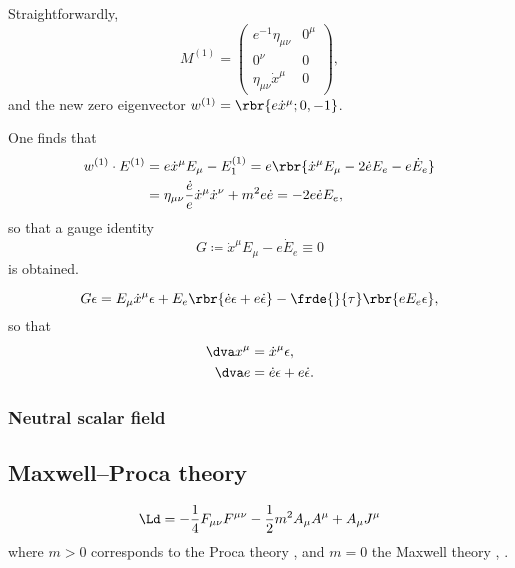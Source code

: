 \documentclass[a4paper,11pt]{article}
\begin{document}
Straightforwardly,
\begin{equation}
M^{(1)} =
\begin{pmatrix}
e^{-1}\eta_{\mu\nu} & 0^\mu \\
0^\nu & 0 \\
\eta_{\mu\nu}\dot{x}^\mu & 0
\end{pmatrix},
\end{equation}
and the new zero eigenvector $w^{(1)} = \rbr{e\dot{x}^\mu; 0, -1}$.

One finds that
\begin{align}
w^{(1)} \cdot E^{(1)} &= e\dot{x}^\mu E_\mu - E^{(1)}_1 =
e\rbr{\dot{x}^\mu E_\mu - 2 \dot{e} E_e - e\dot{E}_e} \\
&= \eta_{\mu\nu} \frac{\dot{e}}{e} \dot{x}^\mu \dot{x}^\nu  + m^2 e \dot{e}
= -2e \dot{e} E_e,
\end{align}
so that a gauge identity
\begin{equation}
G \coloneqq \dot{x}^\mu E_\mu - e \dot{E}_e \equiv 0
\end{equation}
is obtained.

\begin{equation}
G\epsilon = E_\mu \dot{x}^\mu \epsilon + E_e \rbr{\dot{e} \epsilon + e 
\dot{\epsilon}} - \frde{}{\tau}\rbr{e E_e \epsilon},
\end{equation}
so that
\begin{align}
\dva x^\mu &= \dot{x}^\mu \epsilon, \\
\dva e &= \dot{e} \epsilon + e \dot{\epsilon}.
\end{align}






\subsubsection{Neutral scalar field}
\cite[sec.\ 3.3]{Kiefer2012}

\subsection{Maxwell--Proca theory}

\begin{equation}
\Ld = -\frac{1}{4} F_{\mu\nu} F^{\mu\nu} - \frac{1}{2}m^2 A_\mu A^\mu + A_\mu 
J^\mu
\end{equation}
where $m > 0$ corresponds to the Proca theory \cite[sec.\ 2.3]{Gitman1990}, and 
$m = 0$ the Maxwell theory \cite[sec.\ 3.3.3]{Rothe2010}, \cite[sec.\ 
2.4]{Gitman1990}.
\end{document}
